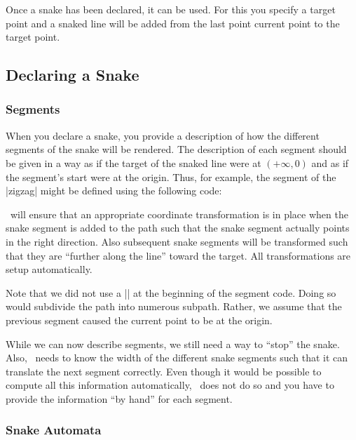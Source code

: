 Once a snake has been declared, it can be used. For this you specify a
target point and a snaked line will be added from the last point
current point to the target point.


\subsection{Declaring a Snake}


\subsubsection{Segments}

When you declare a snake, you provide a description of how the
different segments of the snake will be rendered. The description of
each segment should be given in a way as if the target of the snaked
line were at $(+\infty,0)$ and as if the segment's start were at the
origin. Thus, for example, the segment of the |zigzag| might be
defined using the following code: 
\begin{codeexample}
\pgfpathlineto{\pgfpoint{5pt}{5pt}}
\pgfpathlineto{\pgfpoint{15pt}{-5pt}}
\pgfpathlineto{\pgfpoint{20pt}{0pt}}
\end{codeexample}

\pgfname\ will ensure that an appropriate coordinate transformation
is in place when the snake segment is added to the path such that
the snake segment actually points in the right direction. Also
subsequent snake segments will be transformed such that they are
``further along the line'' toward the target. All transformations
are setup automatically.

Note that we did not use a |\pgfpathmoveto{\pgfpointorigin}| at the
beginning of the segment code. Doing so would subdivide the path into
numerous subpath. Rather, we assume that the previous segment caused
the current point to be at the origin.

While we can now describe segments, we still need a way to ``stop''
the snake. Also, \pgfname\ needs to know the width of the different
snake segments such that it can translate the next segment correctly.
Even though it would be possible to compute all this information
automatically, \pgfname\ does not do so and you have to provide the
information ``by hand'' for each segment. 


\subsubsection{Snake Automata}

